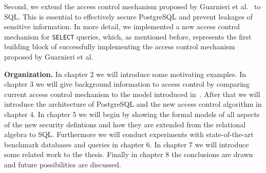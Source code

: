 Second, we extend the access control mechanism proposed by Guarnieri et al.~\cite{guarnieri2016strong} to SQL.
%
This is essential to effectively secure PostgreSQL and prevent leakages of sensitive information.
%
In more detail, we implemented a new access control mechanism for \texttt{SELECT} queries, which, as mentioned before, represents the first building block of successfully implementing the access control mechanism proposed by Guarnieri et al.
%

\smallskip
\noindent
{\bf Organization.}
%
In chapter 2 we will introduce some motivating examples.
%
In chapter 3 we will give background information to access control by comparing current access control mechanism to the model introduced in~\cite{guarnieri2016strong}.
%
After that we will introduce the architecture of PostgreSQL and the new access control algorithm in chapter 4. 
%
In chapter 5 we will begin by showing the formal models of all aspects of the new security defintions and how they are extended from the relational algebra to SQL. 
%
Furthermore we will conduct experiments with state-of-the-art benchmark databases and queries in chapter 6. 
%
In chapter 7 we will introduce some related work to the thesis. 
%
Finally in chapter 8 the conclusions are drawn and future possibilities are discussed.